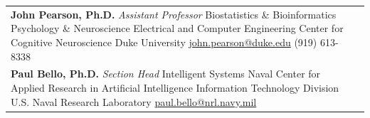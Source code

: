 \documentclass[margin]{res}
\begin{document}
\begin{resume}
\begin{tabular}{p{5.5cm} p{5.5cm}}
    \textbf{John Pearson, Ph.D.}\newline
    \small{
      \emph{Assistant Professor}\newline
      Biostatistics \& Bioinformatics\newline
      Psychology \& Neuroscience\newline
      Electrical and Computer Engineering\newline
      Center for Cognitive Neuroscience\newline
      Duke University\newline
      \href{mailto:john.pearson@duke.edu}{john.pearson@duke.edu}\newline
      (919) 613-8338 \newline}
    \\
    
    \textbf{Paul Bello, Ph.D.}\newline
    \small{
      \emph{Section Head}\newline
      Intelligent Systems\newline
      Naval Center for Applied Research in Artificial Intelligence\newline
      Information Technology Division\newline
      U.S. Naval Research Laboratory\newline
      \href{mailto:paul.bello@nrl.navy.mil}{paul.bello@nrl.navy.mil}
    }
  \end{tabular}
\end{resume}
\end{document}
